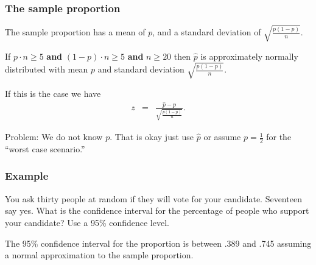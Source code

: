\begin{frame}
  \frametitle{The sample proportion}

  The sample proportion has a mean of $p$, and a standard deviation of
  $\sqrt{\frac{p(1-p)}{n}}$.

  \vfill

  {

    If $p\cdot n \geq 5$ \textbf{and} $(1-p)\cdot n \geq 5$
    \textbf{and} $n\geq 20$ then $\hat{p}$ is approximately normally
    distributed with mean $p$ and standard deviation
    $\sqrt{\frac{p(1-p)}{n}}$.

  }

  \vfill

  {
    If this is the case we have
    \begin{eqnarray*}
      z & = & \frac{\hat{p}-p}{\sqrt{\frac{p(1-p)}{n}}}.
    \end{eqnarray*}
  }

  \vfill

  {
    Problem: We do not know $p$. That is okay just use $\hat{p}$ or
    assume $p=\frac{1}{2}$ for the ``worst case scenario.''
  }


\end{frame}

\begin{frame}
  \frametitle{Example}

  You ask thirty people at random if they will vote for your
  candidate. Seventeen say yes. What is the confidence interval for
  the percentage of people who support your candidate? Use a 95\%
  confidence level.

  \vfill

  {

    The 95\% confidence interval for the proportion is between .389
    and .745 assuming a normal approximation to the sample proportion.

  }

\end{frame}




